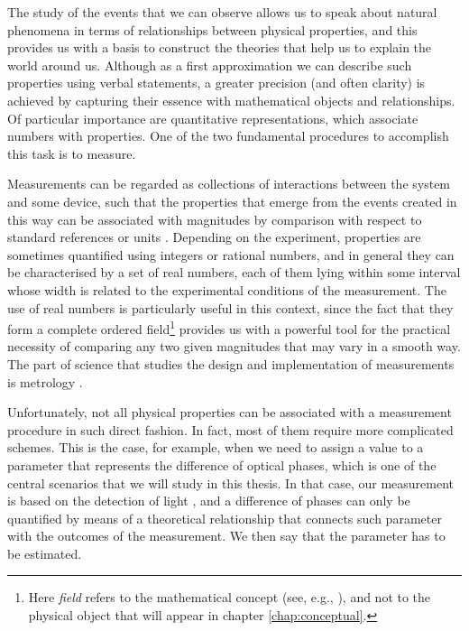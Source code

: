 The study of the events that we can observe allows us to speak about natural phenomena in terms of relationships between physical properties, and this provides us with a basis to construct the theories that help us to explain the world around us. Although as a first approximation we can describe such properties using verbal statements, a greater precision (and often clarity) is achieved by capturing their essence with mathematical objects and relationships. Of particular importance are quantitative representations, which associate numbers with properties. One of the two fundamental procedures to accomplish this task is to measure. 

Measurements can be regarded as collections of interactions between the system and some device, such that the properties that emerge from the events created in this way can be associated with magnitudes by comparison with respect to standard references or units \cite{vim2012}. Depending on the experiment, properties are sometimes quantified using integers or rational numbers, and in general they can be characterised by a set of real numbers, each of them lying within some interval whose width is related to the experimental conditions of the measurement. The use of real numbers is particularly useful in this context, since the fact that they form a complete ordered field\footnote{Here \emph{field} refers to the mathematical concept (see, e.g., \cite{spivak1980}), and not to the physical object that will appear in chapter \ref{chap:conceptual}.} \cite{spivak1980} provides us with a powerful tool for the practical necessity of comparing any two given magnitudes that may vary in a smooth way. The part of science that studies the design and implementation of measurements is metrology \cite{vim2012}.

Unfortunately, not all physical properties can be associated with a measurement procedure in such direct fashion. In fact, most of them require more complicated schemes. This is the case, for example, when we need to assign a value to a parameter that represents the difference of optical phases, which is one of the central scenarios that we will study in this thesis. In that case, our measurement is based on the detection of light \cite{helstrom1976, rafal2015, dowling2014}, and a difference of phases can only be quantified by means of a theoretical relationship that connects such parameter with the outcomes of the measurement. We then say that the parameter has to be estimated. 

